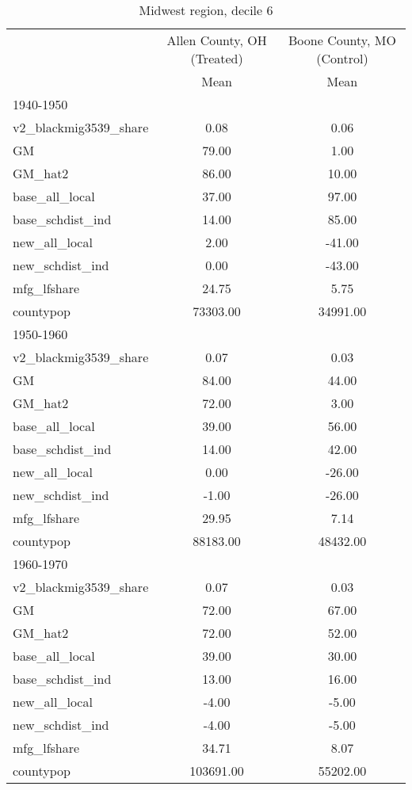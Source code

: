 \begin{table}[htbp]\centering
\def\sym#1{\ifmmode^{#1}\else\(^{#1}\)\fi}
\caption{Midwest region, decile 6 \label{tab1}}
\begin{tabular}{l*{2}{c}}
\toprule
                    &\multicolumn{1}{c}{Allen County, OH (Treated)}&\multicolumn{1}{c}{Boone County, MO (Control)}\\
                    &        Mean&        Mean\\
\midrule
1940-1950           &            &            \\
v2\_blackmig3539\_share&        0.08&        0.06\\
GM                  &       79.00&        1.00\\
GM\_hat2             &       86.00&       10.00\\
base\_all\_local      &       37.00&       97.00\\
base\_schdist\_ind    &       14.00&       85.00\\
new\_all\_local       &        2.00&      -41.00\\
new\_schdist\_ind     &        0.00&      -43.00\\
mfg\_lfshare         &       24.75&        5.75\\
countypop           &    73303.00&    34991.00\\
\midrule
1950-1960           &            &            \\
v2\_blackmig3539\_share&        0.07&        0.03\\
GM                  &       84.00&       44.00\\
GM\_hat2             &       72.00&        3.00\\
base\_all\_local      &       39.00&       56.00\\
base\_schdist\_ind    &       14.00&       42.00\\
new\_all\_local       &        0.00&      -26.00\\
new\_schdist\_ind     &       -1.00&      -26.00\\
mfg\_lfshare         &       29.95&        7.14\\
countypop           &    88183.00&    48432.00\\
\midrule
1960-1970           &            &            \\
v2\_blackmig3539\_share&        0.07&        0.03\\
GM                  &       72.00&       67.00\\
GM\_hat2             &       72.00&       52.00\\
base\_all\_local      &       39.00&       30.00\\
base\_schdist\_ind    &       13.00&       16.00\\
new\_all\_local       &       -4.00&       -5.00\\
new\_schdist\_ind     &       -4.00&       -5.00\\
mfg\_lfshare         &       34.71&        8.07\\
countypop           &   103691.00&    55202.00\\
\bottomrule
\end{tabular}
\end{table}
